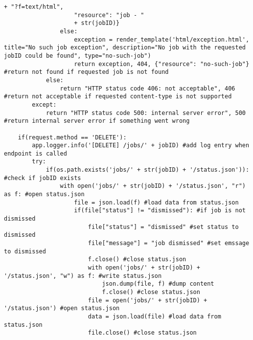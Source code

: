 \begin{lstlisting}[caption={Job Endpoint}, style = Python]
                    + "?f=text/html", 
                    "resource": "job - " 
                    + str(jobID)} 
                else:
                    exception = render_template('html/exception.html', title="No such job exception", description="No job with the requested jobID could be found", type="no-such-job")
                    return exception, 404, {"resource": "no-such-job"} #return not found if requested job is not found
            else:
                return "HTTP status code 406: not acceptable", 406 #return not acceptable if requested content-type is not supported
        except:
            return "HTTP status code 500: internal server error", 500 #return internal server error if something went wrong
        
    if(request.method == 'DELETE'):
        app.logger.info('[DELETE] /jobs/' + jobID) #add log entry when endpoint is called
        try:       
            if(os.path.exists('jobs/' + str(jobID) + '/status.json')): #check if jobID exists
                with open('jobs/' + str(jobID) + '/status.json', "r") as f: #open status.json
                    file = json.load(f) #load data from status.json
                    if(file["status"] != "dismissed"): #if job is not dismissed
                        file["status"] = "dismissed" #set status to dismissed
                        file["message"] = "job dismissed" #set emssage to dismissed
                        f.close() #close status.json
                        with open('jobs/' + str(jobID) + '/status.json', "w") as f: #write status.json
                            json.dump(file, f) #dump content
                            f.close() #close status.json                    
                        file = open('jobs/' + str(jobID) + '/status.json') #open status.json
                        data = json.load(file) #load data from status.json 
                        file.close() #close status.json
                        

\end{lstlisting}
